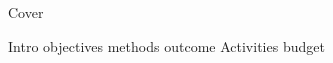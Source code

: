 \documentclass[12pt, openany]{bookest}
\author{Michael Yousuf}
\newcommand{\sectiondir}{sections/}
\begin{document}
{Cover}
\maketitle

\frontmatter
\tableofcontents
\thispagestyle{empty}
\mainmatter

\onehalfspacing %
{Intro}
{objectives}
{methods}
{outcome}
{Activities}
{budget}


\end{document}
